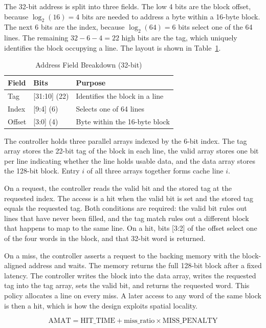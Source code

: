 \documentclass[conference]{IEEEtran}
\begin{document}
The 32-bit address is split into three fields. The low 4 bits are the block offset, because $\log_2(16) = 4$ bits are needed to address a byte within a 16-byte block. The next 6 bits are the index, because $\log_2(64) = 6$ bits select one of the 64 lines. The remaining $32 - 6 - 4 = 22$ high bits are the tag, which uniquely identifies the block occupying a line. The layout is shown in Table~\ref{tab:addr}.

\begin{table}[t]
\caption{Address Field Breakdown (32-bit)}
\label{tab:addr}
\centering
\begin{tabular}{@{}lll@{}}
\toprule
\textbf{Field} & \textbf{Bits} & \textbf{Purpose} \\
\midrule
Tag    & [31:10] (22) & Identifies the block in a line \\
Index  & [9:4] (6)    & Selects one of 64 lines \\
Offset & [3:0] (4)    & Byte within the 16-byte block \\
\bottomrule
\end{tabular}
\end{table}

The controller holds three parallel arrays indexed by the 6-bit index. The tag array stores the 22-bit tag of the block in each line, the valid array stores one bit per line indicating whether the line holds usable data, and the data array stores the 128-bit block. Entry $i$ of all three arrays together forms cache line $i$.

On a request, the controller reads the valid bit and the stored tag at the requested index. The access is a hit when the valid bit is set and the stored tag equals the requested tag. Both conditions are required: the valid bit rules out lines that have never been filled, and the tag match rules out a different block that happens to map to the same line. On a hit, bits [3:2] of the offset select one of the four words in the block, and that 32-bit word is returned.

On a miss, the controller asserts a request to the backing memory with the block-aligned address and waits. The memory returns the full 128-bit block after a fixed latency. The controller writes the block into the data array, writes the requested tag into the tag array, sets the valid bit, and returns the requested word. This policy allocates a line on every miss. A later access to any word of the same block is then a hit, which is how the design exploits spatial locality.

\begin{equation}
\text{AMAT} = \text{HIT\_TIME} + \text{miss\_ratio} \times \text{MISS\_PENALTY}
\end{equation}
\end{document}
